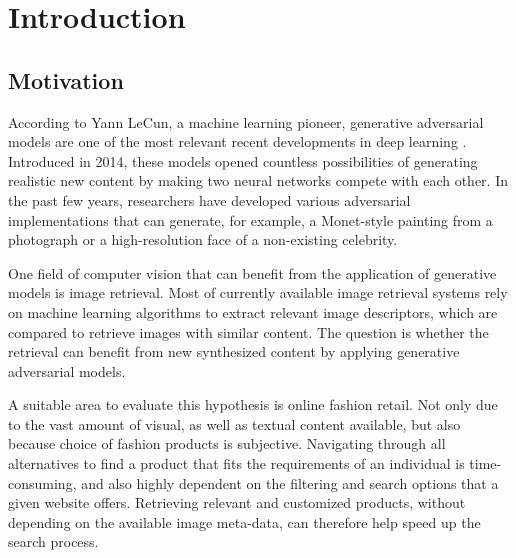 \documentclass[12pt]{report}
\renewcommand{\headrulewidth}{0pt}%
\begin{document}


\pagestyle{plain}
\renewcommand{\baselinestretch}{0.75}\normalsize
\tableofcontents
\renewcommand{\baselinestretch}{1.0}\normalsize
\clearpage


\pagestyle{fancy}
\fancyhf{}
\renewcommand{\chaptermark}[1]{\markboth{\thechapter.\space#1}{}} 
\lhead{\slshape\nouppercase{\leftmark}}
\rhead{ \thepage}
\renewcommand{\headrulewidth}{.5pt}
\chapter{Introduction}

\section{Motivation}
According to Yann LeCun, a machine learning pioneer, generative adversarial models are one of the most relevant recent developments in deep learning \cite{yann_lecun_what_2016}. Introduced in 2014, these models opened countless possibilities of generating realistic new content by making two neural networks compete with each other. In the past few years, researchers have developed various adversarial implementations that can generate, for example, a Monet-style painting from a photograph or a high-resolution face of a non-existing celebrity.

One field of computer vision that can benefit from the application of generative models is image retrieval. Most of currently available image retrieval systems rely on machine learning algorithms to extract relevant image descriptors, which are compared to retrieve images with similar content. The question is whether the retrieval can benefit from new synthesized content by applying generative adversarial models.

A suitable area to evaluate this hypothesis is online fashion retail. Not only due to the vast amount of visual, as well as textual content available, but also because choice of fashion products is subjective. Navigating through all alternatives to find a product that fits the requirements of an individual is time-consuming, and also highly dependent on the filtering and search options that a given website offers. Retrieving relevant and customized products, without depending on the available image meta-data, can therefore help speed up the search process.
\end{document}

